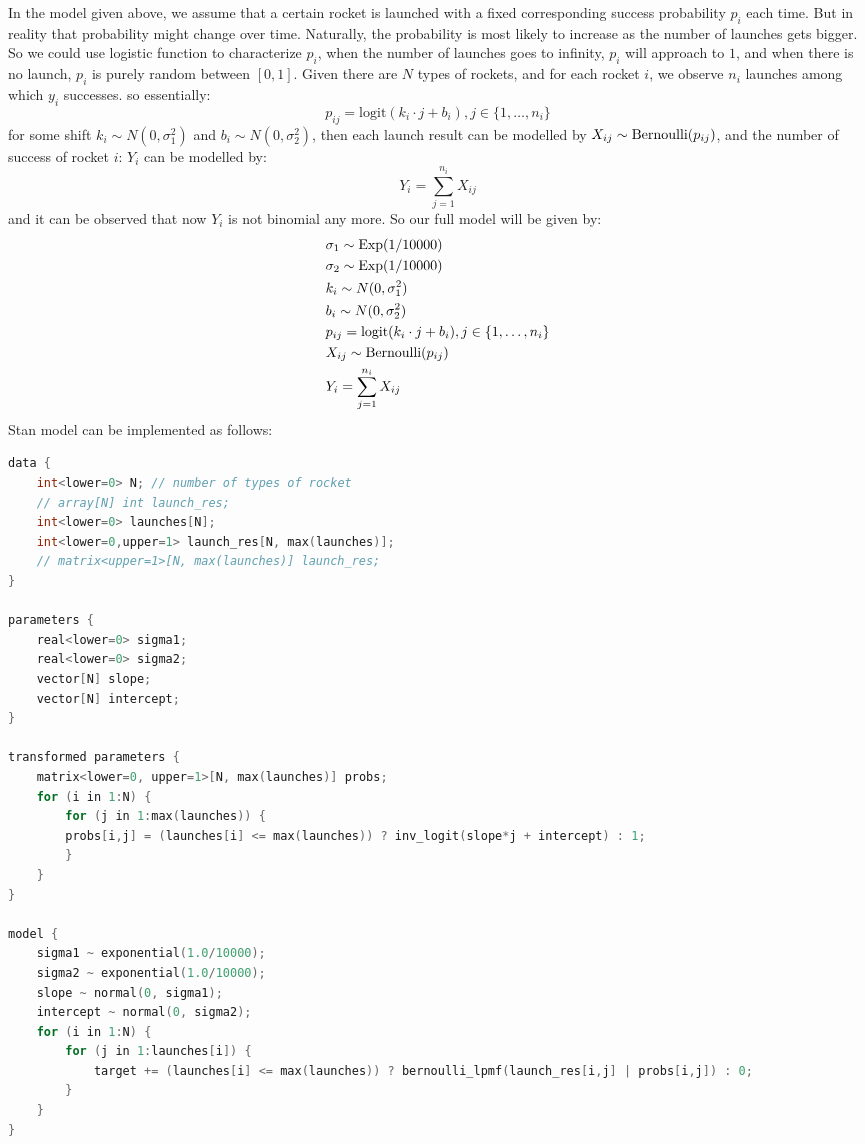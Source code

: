 \documentclass{article}
\begin{document}
In the model given above, we assume that a certain rocket is launched with a fixed corresponding success probability $p_i$ each time. But in reality that probability might change over time. Naturally, the probability is most likely to increase as the number of launches gets bigger. So we could use logistic function to characterize $p_i$, when the number of launches goes to infinity, $p_i$ will approach to $1$, and when there is no launch, $p_i$ is purely random between $[0,1]$. Given there are $N$ types of rockets, and for each rocket $i$, we observe $n_i$ launches among which $y_i$ successes. so essentially:
\begin{equation}
p_{ij} = \text{logit}(k_i \cdot j + b_i), j \in \{1, \ldots, n_i\}
\end{equation}for some shift $k_i \sim N(0, \sigma_1^2)$ and $b_i \sim N(0, \sigma_2^2)$, then each launch result can be modelled by $X_{ij} \sim \operatorname{Bernoulli}(p_{ij})$, and the number of success of rocket $i$: $Y_i$ can be modelled by:
\begin{equation}
Y_i = \sum_{j=1}^{n_i} X_{ij}
\end{equation}and it can be observed that now $Y_i$ is not binomial any more.
So our full model will be given by:
\begin{align*}
& \sigma_1 \sim \operatorname{Exp}(1/10000)\\
& \sigma_2 \sim \operatorname{Exp}(1/10000)\\
& k_i \sim N(0, \sigma_1^2)\\
& b_i \sim N(0, \sigma_2^2)\\
& p_{ij} = \text{logit}(k_i \cdot j + b_i), j \in \{1, \ldots, n_i\}\\
&X_{ij} \sim \operatorname{Bernoulli}(p_{ij})\\
&Y_i = \sum_{j=1}^{n_i} X_{ij}
\end{align*}
Stan model can be implemented as follows:
\begin{lstlisting}[language=C++]
data { 
    int<lower=0> N; // number of types of rocket
    // array[N] int launch_res;
    int<lower=0> launches[N];
    int<lower=0,upper=1> launch_res[N, max(launches)];
    // matrix<upper=1>[N, max(launches)] launch_res;
}
    
parameters {
    real<lower=0> sigma1;
    real<lower=0> sigma2;
    vector[N] slope;
    vector[N] intercept;
}
    
transformed parameters {
    matrix<lower=0, upper=1>[N, max(launches)] probs;
    for (i in 1:N) {
        for (j in 1:max(launches)) {
        probs[i,j] = (launches[i] <= max(launches)) ? inv_logit(slope*j + intercept) : 1;
        }
    }
}
    
model {
    sigma1 ~ exponential(1.0/10000);
    sigma2 ~ exponential(1.0/10000);
    slope ~ normal(0, sigma1);
    intercept ~ normal(0, sigma2);
    for (i in 1:N) {
        for (j in 1:launches[i]) {
            target += (launches[i] <= max(launches)) ? bernoulli_lpmf(launch_res[i,j] | probs[i,j]) : 0;
        }
    }
}
      
\end{lstlisting}
\end{document}
